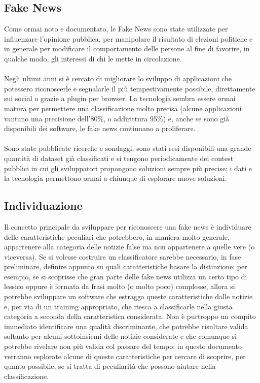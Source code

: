 \documentclass{article}
\begin{document}
    \begin{multicols}{2}
	    \section{Fake News}
			Come ormai noto e documentato, le Fake News sono state utilizzate per influenzare l'opinione pubblica, per manipolare il risultato di elezioni politiche e in generale per modificare il comportamento delle persone al fine di favorire, in qualche modo, gli interessi di chi le mette in circolazione.\\~\\
			Negli ultimi anni si è cercato di migliorare lo sviluppo di applicazioni che potessero riconoscerle e segnalarle il più tempestivamente possibile, direttamente sui social o grazie a plugin per browser. La tecnologia sembra essere ormai matura per permettere una classificazione molto precisa (alcune applicazioni vantano una precisione dell'80\%, o addirittura 95\%) \cite{fakenewschallenge} e, anche se sono già disponibili dei software, le fake news continuano a proliferare.\\~\\	
			Sono state pubblicate ricerche e sondaggi, \cite{fakenewssurvey} \cite{fakenewsdetection} sono stati resi disponibili una grande quantità di dataset già classificati e si tengono periodicamente dei contest pubblici in cui gli sviluppatori propongono soluzioni sempre più precise; i dati e la tecnologia permettono ormai a chiunque di esplorare nuove soluzioni.
			
			\subsection{Individuazione}
			Il concetto principale da sviluppare per riconoscere una fake news è individuare delle caratteristiche peculiari che potrebbero, in maniera molto generale, appartenere alla categoria delle notizie false ma non appartenere a quelle vere (o viceversa). Se si volesse costruire un classificatore sarebbe necessario, in fase preliminare, definire appunto su quali caratteristiche basare la distinzione: per esempio, se si scoprisse che gran parte delle fake news utilizza un certo tipo di lessico oppure è formata da frasi molto (o molto poco) complesse, allora si potrebbe sviluppare un software che estragga queste caratteristiche dalle notizie e, per via di un training appropriato, che riesca a classificarle nella giusta categoria a seconda della caratteristica considerata.
			Non è purtroppo un compito immediato identificare una qualità discriminante, che potrebbe risultare valida soltanto per alcuni sottoinsiemi delle notizie considerate e che comunque si potrebbe rivelare non più valida col passare del tempo; in questo documento verranno esplorate alcune di queste caratteristiche per cercare di scoprire, per quanto possibile, se si tratta di peculiarità che possono aiutare nella classificazione.
	    

\end{multicols}
\end{document}
